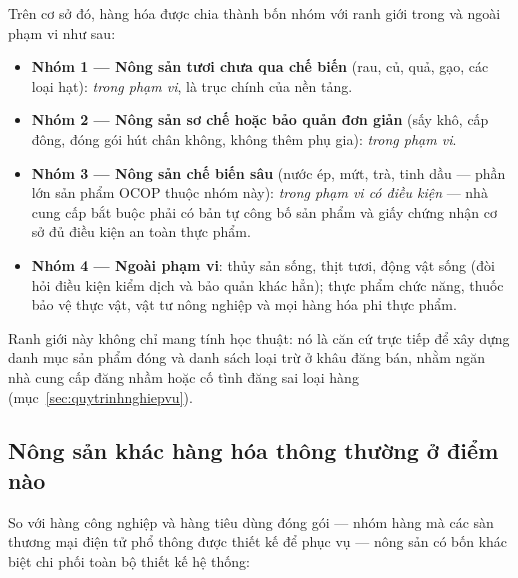 Trên cơ sở đó, hàng hóa được chia thành bốn nhóm với ranh giới trong và ngoài phạm vi như sau:
\begin{itemize}
    \item \textbf{Nhóm 1 --- Nông sản tươi chưa qua chế biến} (rau, củ, quả, gạo, các loại hạt): \emph{trong phạm vi}, là trục chính của nền tảng.
    \item \textbf{Nhóm 2 --- Nông sản sơ chế hoặc bảo quản đơn giản} (sấy khô, cấp đông, đóng gói hút chân không, không thêm phụ gia): \emph{trong phạm vi}.
    \item \textbf{Nhóm 3 --- Nông sản chế biến sâu} (nước ép, mứt, trà, tinh dầu --- phần lớn sản phẩm OCOP thuộc nhóm này): \emph{trong phạm vi có điều kiện} --- nhà cung cấp bắt buộc phải có bản tự công bố sản phẩm và giấy chứng nhận cơ sở đủ điều kiện an toàn thực phẩm.
    \item \textbf{Nhóm 4 --- Ngoài phạm vi}: thủy sản sống, thịt tươi, động vật sống (đòi hỏi điều kiện kiểm dịch và bảo quản khác hẳn); thực phẩm chức năng, thuốc bảo vệ thực vật, vật tư nông nghiệp và mọi hàng hóa phi thực phẩm.
\end{itemize}

Ranh giới này không chỉ mang tính học thuật: nó là căn cứ trực tiếp để xây dựng danh mục sản phẩm đóng và danh sách loại trừ ở khâu đăng bán, nhằm ngăn nhà cung cấp đăng nhầm hoặc cố tình đăng sai loại hàng (mục~\ref{sec:quytrinhnghiepvu}).

\subsection{Nông sản khác hàng hóa thông thường ở điểm nào}
\label{subsec:sosanhnongsan}

So với hàng công nghiệp và hàng tiêu dùng đóng gói --- nhóm hàng mà các sàn thương mại điện tử phổ thông được thiết kế để phục vụ --- nông sản có bốn khác biệt chi phối toàn bộ thiết kế hệ thống:

